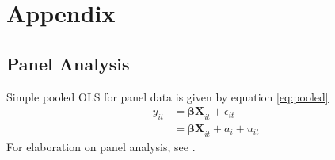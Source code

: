 \section{Appendix}
\label{s:appendix}

\subsection{Panel Analysis}
\label{s:appendix_panel}
Simple pooled OLS for panel data is given by equation \eqref{eq:pooled} \citep{wooldridge2019introductory}
\begin{align}\label{eq:pooled}
    y_{it}
    &= \bm{\beta X}_{it} + \epsilon_{it} \\ 
    &= \bm{\beta X}_{it} + a_i + u_{it} \nonumber
\end{align}
For elaboration on panel analysis, see \citet[chapter 14]{wooldridge2019introductory}.

\begin{figure}
    \centering
\end{figure}

